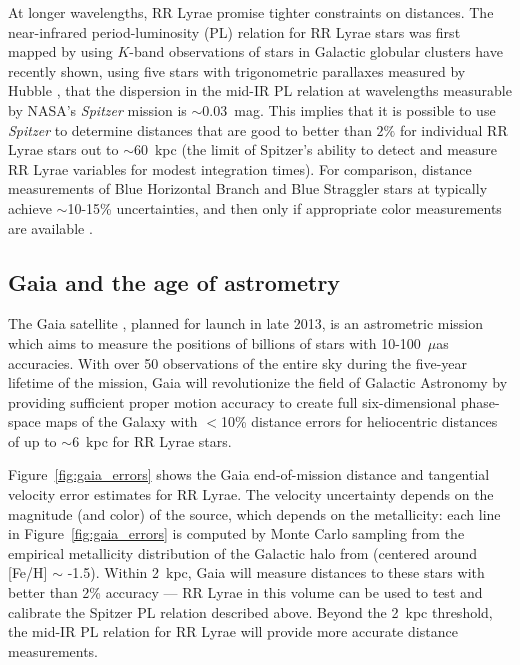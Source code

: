 \documentclass{emulateapj}
\begin{document}
At longer wavelengths, RR Lyrae promise tighter constraints on
distances.  The near-infrared period-luminosity (PL) relation for RR
Lyrae stars was first mapped by \citet{longmore86} using $K$-band
observations of stars in Galactic globular clusters 
\citet{madore12} have recently shown, 
using five stars with
trigonometric parallaxes measured by Hubble \citep{benedict11},
that the dispersion in the mid-IR PL relation at
wavelengths measurable by NASA's {\it Spitzer} mission is $\sim$0.03~mag.
This implies that it is
possible to use {\it Spitzer} to determine distances that are good to better
than $2\%$ for individual RR Lyrae stars out to $\sim$60~kpc (the limit of
Spitzer's ability to detect and measure RR Lyrae variables for modest
integration times). 
For comparison, distance measurements of Blue Horizontal Branch
and Blue Straggler stars at typically
achieve $\sim$10-15\% uncertainties, and then only if appropriate color measurements are available \citep[e.g.,][]{deason12b}.


\subsection{Gaia and the age of astrometry}
\label{sec:gaia}
The Gaia satellite \citep{gaia01}, planned for launch in late 2013, is
an astrometric mission which aims to measure the positions of billions
of stars with 10-100~$\mu$as accuracies. With over 50 observations of
the entire sky during the five-year lifetime of the mission, Gaia will
revolutionize the field of Galactic Astronomy by providing sufficient
proper motion accuracy to create full six-dimensional phase-space maps
of the Galaxy with $<$10\% distance errors for heliocentric distances of
up to $\sim$6~kpc for RR Lyrae stars.

Figure~\ref{fig:gaia_errors} shows the Gaia end-of-mission distance
and tangential velocity error estimates for RR Lyrae. The velocity
uncertainty depends on the magnitude (and color) of the source, which depends on
the metallicity: each line in Figure~\ref{fig:gaia_errors} is computed
by Monte Carlo sampling from the empirical metallicity distribution of
the Galactic halo from \cite{ivezic08} (centered around [Fe/H] $\sim$
-1.5). Within 2~kpc, Gaia will measure distances to these stars with
better than 2\% accuracy --- RR Lyrae in this volume can be used to
test and calibrate the Spitzer PL relation described above. Beyond the
2~kpc threshold, the mid-IR PL relation for RR Lyrae will provide more
accurate distance measurements.
\end{document}
